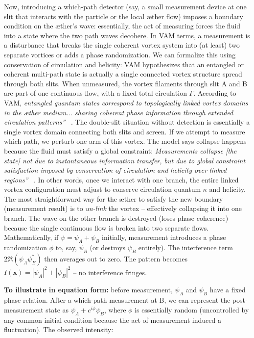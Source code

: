 \documentclass[a4paper, aps,preprint,superscriptaddress, 12pt]{revtex4}
\begin{document}
Now, introducing a which-path detector (say, a small measurement device at one slit that interacts with the particle or the local æther flow) imposes a boundary condition on the æther's wave: essentially, the act of measuring forces the fluid into a state where the two path waves decohere. In VAM terms, a measurement is a disturbance that breaks the single coherent vortex system into (at least) two separate vortices or adds a phase randomization. We can formalize this using conservation of circulation and helicity: VAM hypothesizes that an entangled or coherent multi-path state is actually a single connected vortex structure spread through both slits. When unmeasured, the vortex filaments through slit A and B are part of one continuous flow, with a fixed total circulation $\Gamma$. According to VAM, \textit{\grqq entangled quantum states correspond to topologically linked vortex domains in the æther medium... sharing coherent phase information through extended circulation patterns\textquotedblright}~\cite{Iskandarani2025c} . The double-slit situation without detection is essentially a single vortex domain connecting both slits and screen. If we attempt to measure which path, we perturb one arm of this vortex. The model says collapse happens because the fluid must satisfy a global constraint: \textit{\grqq Measurements collapse [the state] not due to instantaneous information transfer, but due to global constraint satisfaction imposed by conservation of circulation and helicity over linked regions\textquotedblright}~\cite{Iskandarani2025c} . In other words, once we interact with one branch, the entire linked vortex configuration must adjust to conserve circulation quantum $\kappa$ and helicity. The most straightforward way for the æther to satisfy the new boundary (measurement result) is to \textit{un-link} the vortex – effectively collapsing it into one branch. The wave on the other branch is destroyed (loses phase coherence) because the single continuous flow is broken into two separate flows. Mathematically, if $\psi = \psi_A + \psi_B$ initially, measurement introduces a phase randomization $\phi$ to, say, $\psi_B$ (or destroys $\psi_B$ entirely). The interference term $2\Re(\psi_A\psi_B^*)$ then averages out to zero. The pattern becomes $I(\mathbf{x}) = |\psi_A|^2 + |\psi_B|^2$ – no interference fringes.


\textbf{To illustrate in equation form:} before measurement, $\psi_A$ and $\psi_B$ have a fixed phase relation. After a which-path measurement at B, we can represent the post-measurement state as $\psi_A + e^{i\phi}\psi_B$, where $\phi$ is essentially random (uncontrolled by any common initial condition because the act of measurement induced a fluctuation). The observed intensity:
\end{document}
